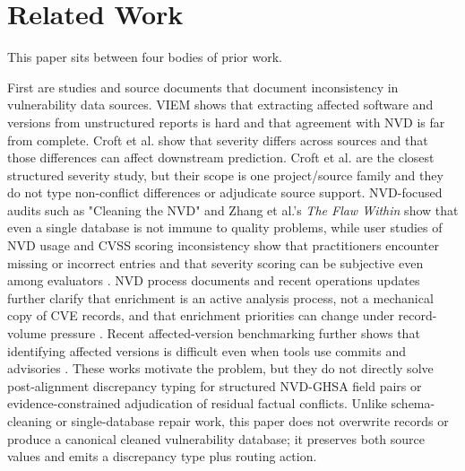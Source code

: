 \section{Related Work}

This paper sits between four bodies of prior work.

First are studies and source documents that document inconsistency in vulnerability data sources. VIEM \cite{VIEM2019} shows that extracting affected software and versions from unstructured reports is hard and that agreement with NVD is far from complete. Croft et al. \cite{Croft2022} show that severity differs across sources and that those differences can affect downstream prediction. Croft et al. are the closest structured severity study, but their scope is one project/source family and they do not type non-conflict differences or adjudicate source support. NVD-focused audits such as "Cleaning the NVD" \cite{Anwar2022} and Zhang et al.'s \emph{The Flaw Within} \cite{Zhang2023} show that even a single database is not immune to quality problems, while user studies of NVD usage and CVSS scoring inconsistency show that practitioners encounter missing or incorrect entries and that severity scoring can be subjective even among evaluators \cite{NVDUsers2024,Wunder2024}. NVD process documents and recent operations updates further clarify that enrichment is an active analysis process, not a mechanical copy of CVE records, and that enrichment priorities can change under record-volume pressure \cite{NVDProcess2026,NVDStatus2026,NVDTransition2024,NVDOperations2026}. Recent affected-version benchmarking further shows that identifying affected versions is difficult even when tools use commits and advisories \cite{Chen2025AffectedVersions}. These works motivate the problem, but they do not directly solve post-alignment discrepancy typing for structured NVD-GHSA field pairs or evidence-constrained adjudication of residual factual conflicts. Unlike schema-cleaning or single-database repair work, this paper does not overwrite records or produce a canonical cleaned vulnerability database; it preserves both source values and emits a discrepancy type plus routing action.

